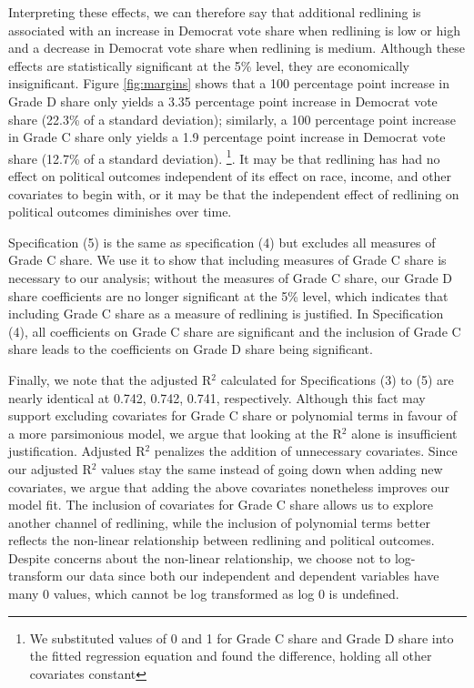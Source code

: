 \documentclass{eco_375_paper}
\begin{document}
Interpreting these effects, we can therefore say that additional redlining is associated with an increase in Democrat vote share when redlining is low or high and a decrease in Democrat vote share when redlining is medium. Although these effects are statistically significant at the 5\% level, they are economically insignificant. Figure \ref{fig:margins} shows that a 100 percentage point increase in Grade D share only yields a 3.35 percentage point increase in Democrat vote share (22.3\% of a standard deviation); similarly, a 100 percentage point increase in Grade C share only yields a 1.9 percentage point increase in Democrat vote share (12.7\% of a standard deviation). \footnote{We substituted values of 0 and 1 for Grade C share and Grade D share into the fitted regression equation and found the difference, holding all other covariates constant}. It may be that redlining has had no effect on political outcomes independent of its effect on race, income, and other covariates to begin with, or it may be that the independent effect of redlining on political outcomes diminishes over time.

Specification (5) is the same as specification (4) but excludes all measures of Grade C share. We use it to show that including measures of Grade C share is necessary to our analysis; without the measures of Grade C share, our Grade D share coefficients are no longer significant at the 5\% level, which indicates that including Grade C share as a measure of redlining is justified. In Specification (4), all coefficients on Grade C share are significant and the inclusion of Grade C share leads to the coefficients on Grade D share being significant.

Finally, we note that the adjusted R$^2$ calculated for Specifications (3) to (5) are nearly identical at 0.742, 0.742, 0.741, respectively. Although this fact may support excluding covariates for Grade C share or polynomial terms in favour of a more parsimonious model, we argue that looking at the R$^2$ alone is insufficient justification. Adjusted R$^2$ penalizes the addition of unnecessary covariates. Since our adjusted R$^2$ values stay the same instead of going down when adding new covariates, we argue that adding the above covariates nonetheless improves our model fit. The inclusion of covariates for Grade C share allows us to explore another channel of redlining, while the inclusion of polynomial terms better reflects the non-linear relationship between redlining and political outcomes. Despite concerns about the non-linear relationship, we choose not to log-transform our data since both our independent and dependent variables have many 0 values, which cannot be log transformed as log 0 is undefined.
\end{document}
